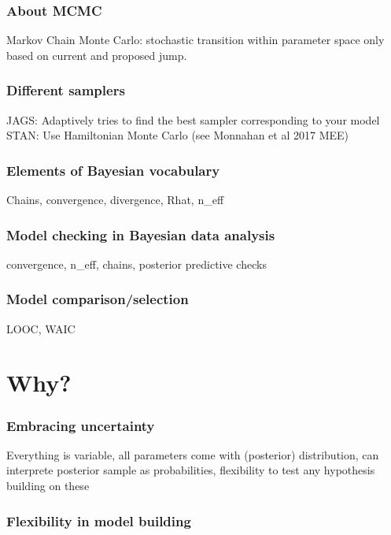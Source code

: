 \documentclass{beamer}
\begin{document}
\begin{frame}
\begin{frame}
 \end{frame}
 
 \begin{frame}
  \frametitle{\bf About MCMC}
  
  Markov Chain Monte Carlo: stochastic transition within parameter space only based on current and proposed jump.
  
 \end{frame}


  \begin{frame}
  \frametitle{\bf Different samplers}
  
  JAGS: Adaptively tries to find the best sampler corresponding to your model
  STAN: Use Hamiltonian Monte Carlo (see Monnahan et al 2017 MEE)
  
 \end{frame}
 
   
  \begin{frame}
  \frametitle{\bf Elements of Bayesian vocabulary}
  
  Chains, convergence, divergence, Rhat, n\_eff
  
 \end{frame}
 
  \begin{frame}
  \frametitle{\bf Model checking in Bayesian data analysis}
  
  convergence, n\_eff, chains, posterior predictive checks
  
 \end{frame}
 
  \begin{frame}
  \frametitle{\bf Model comparison/selection}
  
  LOOC, WAIC
  
 \end{frame}
 

\section{Why?}
 
  \begin{frame}
  \frametitle{\bf Embracing uncertainty}
  
  Everything is variable, all parameters come with (posterior) distribution, can interprete posterior sample
  as probabilities, flexibility to test any hypothesis building on these
  
 \end{frame}
 
  \begin{frame}
  \frametitle{\bf Flexibility in model building}
  

\end{frame}
\end{frame}
\end{document}
